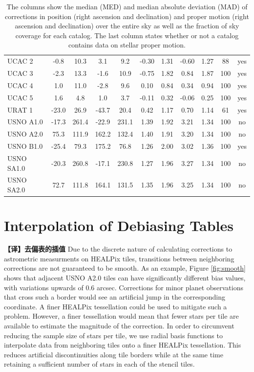 \documentclass[review]{elsarticle}
\begin{document}
\begin{table}
\begin{center}
\begin{tabular}{|l|cc|cc|cc|cc|c|c|}
UCAC 2& -0.8& 10.3& 3.1& 9.2& -0.30& 1.31& -0.60& 1.27& 88& yes\\ 
UCAC 3& -2.3& 13.3& -1.6& 10.9& -0.75& 1.82& 0.84& 1.87& 100& yes\\ 
UCAC 4& 1.0& 11.0& -2.8& 9.6& 0.10& 0.84& 0.34& 0.94& 100& yes\\ 
UCAC 5& 1.6& 4.8& 1.0& 3.7& -0.11& 0.32& -0.06& 0.25& 100& yes\\ 
URAT 1& -23.0& 26.9& -43.7& 20.4& 0.42& 1.17& 0.70& 1.14& 61& yes\\ 
USNO A1.0&-17.3& 261.4& -22.9& 231.1& 1.39& 1.92& 3.21& 1.34& 100& no\\ 
USNO A2.0& 75.3& 111.9& 162.2& 132.4& 1.40& 1.91& 3.20& 1.34& 100& no\\ 
USNO B1.0& -25.4& 79.3& 175.2& 76.8& 1.26& 2.00& 3.02& 1.36& 100& yes\\ 
USNO SA1.0& -20.3& 260.8& -17.1& 230.8& 1.27& 1.96& 3.27& 1.34&100& no\\
USNO SA2.0& 72.7& 111.8& 164.1& 131.5& 1.35& 1.96& 3.25& 1.34& 100& no\\ 
\hline
\end{tabular}
\end{center}
\caption{The columns show the median (MED) and median absolute deviation (MAD) of corrections in
  position (right ascension and declination) and proper motion (right ascension and declination) over the entire sky as well as the fraction of sky coverage for each catalog. The last column states whether or not a catalog contains data on stellar proper motion.}
\label{tab:cat_stats}
\end{table}
\section{Interpolation of Debiasing Tables}
\textbf{【译】去偏表的插值}
\label{sec:interp}
Due to the discrete nature of calculating corrections to astrometric measurments on HEALPix tiles, transitions between neighboring corrections are not guaranteed to be smooth. 
As an example, Figure \ref{fig:smooth} shows that adjacent USNO A2.0 tiles can have significantly different bias values, with variations upwards of 0.6 arcsec.
Corrections for minor planet observations that cross such a border would see an artificial jump in the corresponding coordinate. A finer HEALPix tessellation could be used to mitigate such a problem. However, a finer tessellation would mean that fewer stars per tile are available to estimate the magnitude of the correction. 
In order to circumvent reducing the sample size of stars per tile, we use radial basis functions \citep[RBFs,][]{schaback1995} to interpolate data from neighboring tiles onto a finer HEALPix tessellation. This reduces artificial discontinuities along tile borders while at the same time retaining a sufficient number of stars in each of the stencil tiles.   
\end{document}
